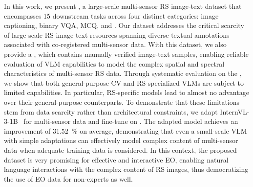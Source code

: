 In this work, we present \bentxt{}, a large-scale multi-sensor \ac{RS} image-text dataset that encompasses 15 downstream tasks across four distinct categories: image captioning, binary \ac{VQA}, \ac{MCQ}, and \genDet.
Our dataset addresses the critical scarcity of large-scale \ac{RS} image-text resources spanning diverse textual annotations associated with co-registered multi-sensor data.
With this dataset, we also provide a \bench{}, which contains manually verified image-text samples, enabling reliable evaluation of \ac{VLM} capabilities to model the complex spatial and spectral characteristics of multi-sensor \ac{RS} data.
Through systematic evaluation on the \bench{}, we show that both general-purpose \ac{CV} and \ac{RS}-specialized \acp{VLM} are subject to limited capabilities. In particular, \ac{RS}-specific models lead to almost no advantage over their general-purpose counterparts.
To demonstrate that these limitations stem from data scarcity rather than architectural constraints, we adapt InternVL-3-1B~\cite{zhu2025internvl3} for multi-sensor data and fine-tune on \bentxt{}.
The adapted model achieves an improvement of \SI{31.52}{\percent} on average, demonstrating that even a small-scale \ac{VLM} with simple adaptations can effectively model complex content of multi-sensor data when adequate training data is considered. 
In this context, the proposed dataset is very promising for effective and interactive \ac{EO}, enabling natural language interactions with the complex content of \ac{RS} images, thus democratizing the use of EO data for non-experts as well. 